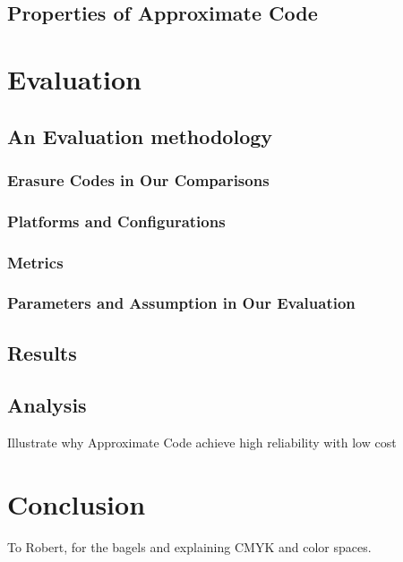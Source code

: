 \documentclass[sigconf]{acmart}
\begin{document}
\subsection{Properties of Approximate Code}

\section{Evaluation}\label{evaluation}
\subsection{An Evaluation methodology}
\subsubsection{Erasure Codes in Our Comparisons}
\subsubsection{Platforms and Configurations}
\subsubsection{Metrics}
\subsubsection{Parameters and Assumption in Our Evaluation}


\subsection{Results}
\subsection{Analysis}
Illustrate why Approximate Code achieve high reliability with low cost
\section{Conclusion}

%
\begin{acks}
To Robert, for the bagels and explaining CMYK and color spaces.
\end{acks}

%


\end{document}
